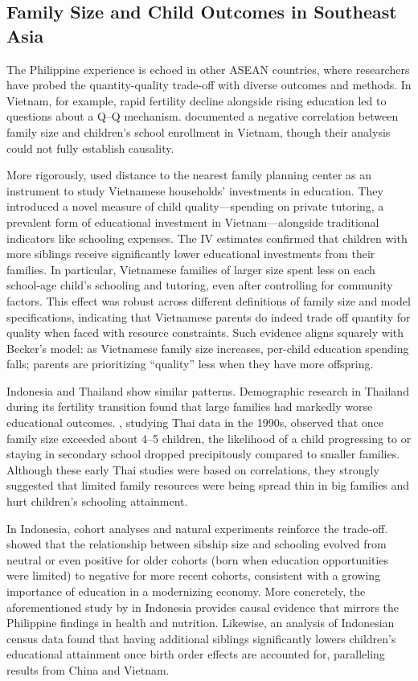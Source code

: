 \documentclass[]{AEA}
\begin{document}
\subsection{Family Size and Child Outcomes in Southeast Asia}

The Philippine experience is echoed in other ASEAN countries, where
researchers have probed the quantity-quality trade-off with diverse
outcomes and methods. In Vietnam, for example, rapid fertility decline
alongside rising education led to questions about a Q--Q mechanism.
\citet{anh1998family} documented a negative correlation between family
size and children's school enrollment in Vietnam, though their analysis
could not fully establish causality.

More rigorously, \citet{dang2016decision} used distance to the nearest
family planning center as an instrument to study Vietnamese households'
investments in education. They introduced a novel measure of child
quality---spending on private tutoring, a prevalent form of educational
investment in Vietnam---alongside traditional indicators like schooling
expenses. The IV estimates confirmed that children with more siblings
receive significantly lower educational investments from their families.
In particular, Vietnamese families of larger size spent less on each
school-age child's schooling and tutoring, even after controlling for
community factors. This effect was robust across different definitions
of family size and model specifications, indicating that Vietnamese
parents do indeed trade off quantity for quality when faced with
resource constraints. Such evidence aligns squarely with Becker's model:
as Vietnamese family size increases, per-child education spending falls;
parents are prioritizing ``quality'' less when they have more offspring.

Indonesia and Thailand show similar patterns. Demographic research in
Thailand during its fertility transition found that large families had
markedly worse educational outcomes. \citet{knodel1990family}, studying
Thai data in the 1990s, observed that once family size exceeded about
4--5 children, the likelihood of a child progressing to or staying in
secondary school dropped precipitously compared to smaller families.
Although these early Thai studies were based on correlations, they
strongly suggested that limited family resources were being spread thin
in big families and hurt children's schooling attainment.

In Indonesia, cohort analyses and natural experiments reinforce the
trade-off. \citet{maralani2008changing} showed that the relationship
between sibship size and schooling evolved from neutral or even positive
for older cohorts (born when education opportunities were limited) to
negative for more recent cohorts, consistent with a growing importance
of education in a modernizing economy. More concretely, the
aforementioned study by \citet{hatton2018fertility} in Indonesia
provides causal evidence that mirrors the Philippine findings in health
and nutrition. Likewise, an analysis of Indonesian census data
\citep{feng2021effect} found that having additional siblings
significantly lowers children's educational attainment once birth order
effects are accounted for, paralleling results from China and Vietnam.
\end{document}
